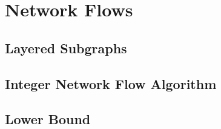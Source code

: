 \section{Network Flows}

\subsection{Layered Subgraphs}

\subsection{Integer Network Flow Algorithm}

\subsection{Lower Bound}